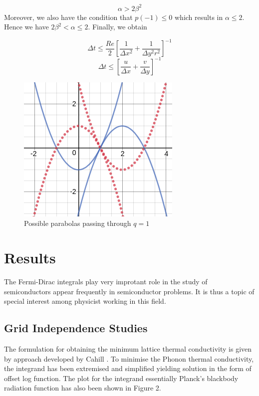 \documentclass{article}
\begin{document}
\begin{equation}
\alpha > 2 \beta^2
\end{equation}
Moreover, we also have the condition that $p(-1) \leq 0$ which results in $\alpha \leq 2$. Hence we have $2\beta^2<\alpha \leq 2$.
Finally, we obtain 

\begin{equation}
\Delta t \leq \frac{Re}{2}\left[\frac{1}{\Delta x^2} + \frac{1}{\Delta y^2r^2}\right]^{-1}
\end{equation}
\begin{equation}
\Delta t \leq  \left[\frac{u}{\Delta x}+\frac{v}{\Delta y}\right]^{-1}
\end{equation}

\begin{figure}[h!]
\centering
\includegraphics[scale=.5]{par1.png}
\caption{Possible parabolas passing through $q=1$}
\label{fig:para1}
\end{figure}


\section{Results}
The Fermi-Dirac integrals play very improtant role in the study of semiconductors appear frequently in semiconductor problems. It is thus a topic of special interest among physicist working in this field.

\subsection{Grid Independence Studies}
The formulation for obtaining the minimum lattice thermal conductivity is given by approach developed by Cahill \citep{PhysRevB.46.6131}. To minimise the Phonon thermal conductivity, the integrand has been extremised and simplified yielding solution in the form of offset log function. The plot for the integrand essentially Planck's blackbody radiation function has also been shown in Figure 2.
\end{document}
